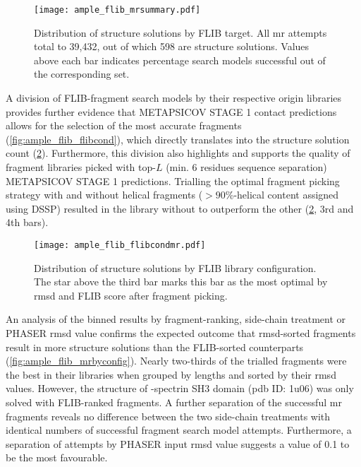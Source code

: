 \begin{figure}[H]
	\centering
	\texttt{[image: ample\_flib\_mrsummary.pdf]}
	\caption[MR structure solutions by FLIB target]{Distribution of structure solutions by FLIB target. All \gls{mr} attempts total to 39,432, out of which 598 are structure solutions. Values above each bar indicates percentage search models successful out of the corresponding set.}
	\label{fig:ample_flib_mrsummary}
\end{figure}

A division of FLIB-fragment search models by their respective origin libraries provides further evidence that METAPSICOV STAGE 1 contact predictions allows for the selection of the most accurate fragments (\cref{fig:ample_flib_flibcond}), which directly translates into the structure solution count (\cref{fig:ample_flib_flibcondmr}). Furthermore, this division also highlights and supports the quality of fragment libraries picked with top-$L$ (min. 6 residues sequence separation) METAPSICOV STAGE 1 predictions. Trialling the optimal fragment picking strategy with and without helical fragments ($>90$\%-helical content assigned using DSSP) resulted in the library without to outperform the other (\cref{fig:ample_flib_flibcondmr}, 3rd and 4th bars). 

\begin{figure}[H]
	\centering
	\texttt{[image: ample\_flib\_flibcondmr.pdf]}
	\caption[MR structure solutions by FLIB library]{Distribution of structure solutions by FLIB library configuration. The star above the third bar marks this bar as the most optimal by \gls{rmsd} and FLIB score after fragment picking.}
	\label{fig:ample_flib_flibcondmr}
\end{figure}

An analysis of the binned results by fragment-ranking, side-chain treatment or PHASER \gls{rmsd} value confirms the expected outcome that \gls{rmsd}-sorted fragments result in more structure solutions than the FLIB-sorted counterparts (\cref{fig:ample_flib_mrbyconfig}). Nearly two-thirds of the trialled fragments were the best in their libraries when grouped by lengths and sorted by their \gls{rmsd} values. However, the structure of \textalpha-spectrin SH3 domain (\gls{pdb} ID: 1u06) was only solved with FLIB-ranked fragments. A further separation of the successful \gls{mr} fragments reveals no difference between the two side-chain treatments with identical numbers of successful fragment search model attempts. Furthermore, a separation of attempts by PHASER input \gls{rmsd} value suggests a value of 0.1 to be the most favourable.

